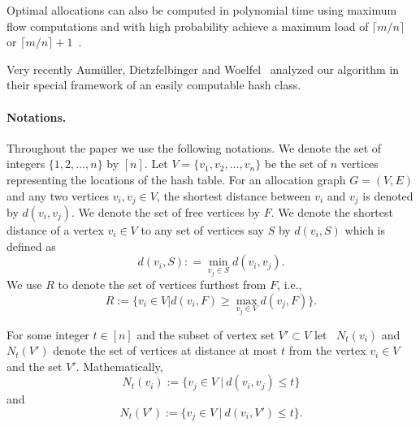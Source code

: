 \noindent Optimal allocations can also
be computed in polynomial time using maximum 
flow computations and with high probability achieve a maximum load of 
$\lceil m/n\rceil$ or $\lceil m/n\rceil +1$~\cite{sek99}. 

Very recently Aum{\"u}ller, Dietzfelbinger and Woelfel~\cite{art:aumuller16} analyzed our algorithm in their special framework of an easily computable hash class.

\paragraph{Notations.} Throughout the paper we use the following notations. We denote the set of integers $\{1,2,\ldots, n\}$ by $[n]$. Let $V=\{v_1,v_2,\ldots, v_n\}$ be the set of $n$ vertices representing the locations of the hash table. For an allocation graph $G=(V,E)$ and any two vertices $v_i,v_j\in V$, the shortest distance between $v_i$ and $v_j$ is denoted by $d(v_i,v_j).$  We denote the set of free vertices by $F$. We denote the shortest distance of a vertex $v_i\in V$ to any set of vertices say $S$ by $d(v_i,S)$ which is defined as \[d(v_i,S): = \min_{v_j\in S} d(v_i,v_j).\] We use $R$ to denote the set of vertices furthest from $F$, i.e.,
\[   R:= \{ v_i\in V |d(v_i, F ) \ge \max_{ v_j \in V} d(v_j,F)\}.
\]

For some integer $t\in[n]$ and the subset of vertex set $V' \subset V$ let ~$N_{t}(v_i)$ and $N_{t}(V')$ denote the set of vertices at distance at most $t$ from the vertex $v_i \in V$ and the set $V'$. Mathematically,
\[ N_{t}(v_i) := \{ v_j \in V~| ~d(v_i,v_j) \le t  \} \]
and 
\[ N_{t}(V') := \{ v_j \in V~| ~d(v_i,V') \le t  \} .\]
